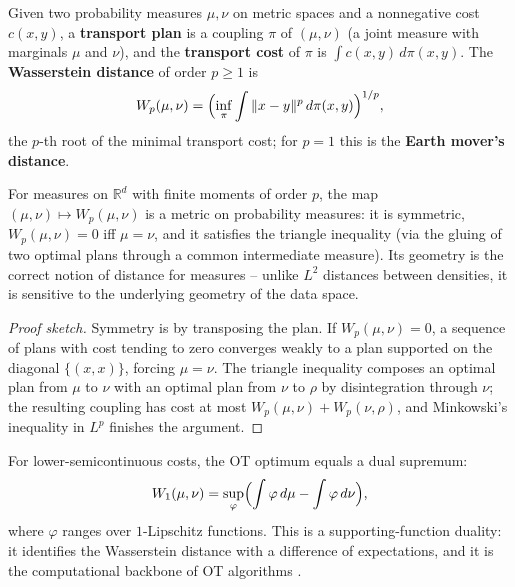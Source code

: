 \begin{definition}\label{def:data_ml_transport}
  Given two probability measures $\mu, \nu$ on metric spaces and a
  nonnegative cost $c(x, y)$, a \textbf{transport plan} is a coupling $\pi$
  of $(\mu, \nu)$ (a joint measure with marginals $\mu$ and $\nu$), and the
  \textbf{transport cost} of $\pi$ is $\int c(x,y)\, d\pi(x,y)$. The
  \textbf{Wasserstein distance} of order $p \geq 1$ is
  \[
    W_p(\mu, \nu) = \Bigl( \inf_{\pi} \int \|x - y\|^p\, d\pi(x,y) \Bigr)^{1/p},
  \]
  the $p$-th root of the minimal transport cost; for $p = 1$ this is the
  \textbf{Earth mover's distance}.
\end{definition}

\begin{theorem}\label{thm:data_ml_wasserstein}
  For measures on $\mathbb{R}^d$ with finite moments of order $p$, the map
  $(\mu, \nu) \mapsto W_p(\mu, \nu)$ is a metric on probability measures:
  it is symmetric, $W_p(\mu, \nu) = 0$ iff $\mu = \nu$, and it satisfies the
  triangle inequality (via the gluing of two optimal plans through a common
  intermediate measure). Its geometry is the correct notion of distance for
  measures -- unlike $L^2$ distances between densities, it is sensitive to
  the underlying geometry of the data space.
\end{theorem}

\begin{proof}[Proof sketch]
  Symmetry is by transposing the plan. If $W_p(\mu,\nu) = 0$, a sequence of
  plans with cost tending to zero converges weakly to a plan supported on
  the diagonal $\{(x,x)\}$, forcing $\mu = \nu$. The triangle inequality
  composes an optimal plan from $\mu$ to $\nu$ with an optimal plan from
  $\nu$ to $\rho$ by disintegration through $\nu$; the resulting coupling
  has cost at most $W_p(\mu,\nu) + W_p(\nu,\rho)$, and Minkowski's
  inequality in $L^p$ finishes the argument.
\end{proof}

\begin{theorem}\label{thm:data_ml_kantorovich}
  For lower-semicontinuous costs, the OT optimum equals a dual supremum:
  \[
    W_1(\mu, \nu) = \sup_{\varphi} \Bigl( \int \varphi\, d\mu - \int \varphi\,
    d\nu \Bigr),
  \]
  where $\varphi$ ranges over $1$-Lipschitz functions. This is a
  supporting-function duality: it identifies the Wasserstein distance with a
  difference of expectations, and it is the computational backbone of OT
  algorithms \cite{peyre2019}.
\end{theorem}


